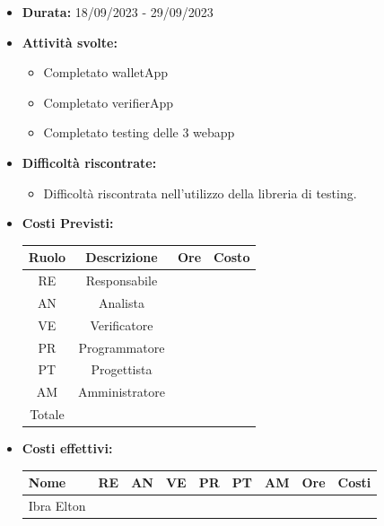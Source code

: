         \begin{itemize}
            \item \textbf{Durata:} 18/09/2023 - 29/09/2023 
            \item \textbf{Attività svolte:}
            \begin{itemize}
                \item Completato walletApp
                \item Completato verifierApp
                \item Completato testing delle 3 webapp 
                
            \end{itemize}
            \item \textbf{Difficoltà riscontrate:}
            \begin{itemize}
                \item Difficoltà riscontrata nell'utilizzo della libreria di testing. 
            \end{itemize}
            \item \textbf{Costi Previsti:}
            \begin{longtable}{|c|c|c|c|}
                \hline
                Ruolo & Descrizione & Ore & Costo \\
                \hline
                RE & Responsabile &  &  \\
                \hline
                AN & Analista &  &  \\
                \hline
                VE & Verificatore &  &  \\
                \hline
                PR & Programmatore &  &  \\
                \hline
                PT & Progettista &  &  \\
                \hline
                AM & Amministratore &  &  \\
                \hline
                Totale & &  &  \\
                \hline
                \end{longtable}
            \item \textbf{Costi effettivi:}
            \begin{longtable}{|p{}|c|c|c|c|c|c|c|c|}
                \hline
                Nome & RE & AN & VE & PR & PT & AM & Ore & Costi\\
                \hline
                Ibra \newline Elton & & & & & & & & \\

\end{longtable}
\end{itemize}
